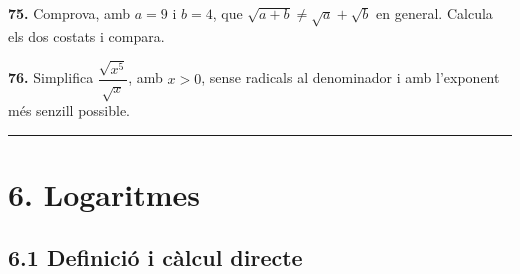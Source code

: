 \documentclass[13pt,a4paper]{extarticle}
\begin{document}
\par\noindent\begin{minipage}{\linewidth}
\textbf{75.} Comprova, amb $a=9$ i $b=4$, que $\sqrt{a+b}\neq\sqrt{a}+\sqrt{b}$ en general. Calcula els dos costats i compara.\par
\end{minipage}\par\vspace{1.6mm}
\par\noindent\begin{minipage}{\linewidth}
\textbf{76.} Simplifica $\dfrac{\sqrt{x^5}}{\sqrt{x}}$, amb $x>0$, sense radicals al denominador i amb l'exponent més senzill possible.\par
\end{minipage}\par\vspace{1.6mm}
\vspace{1mm}\hrule\vspace{3mm}

\section*{6. Logaritmes}

\subsection*{6.1 Definició i càlcul directe}
\end{document}
